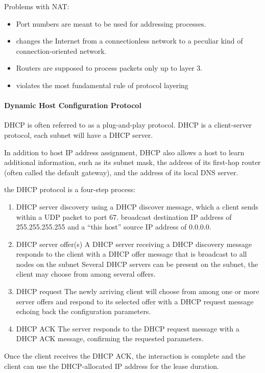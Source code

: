 Problems with NAT:
\begin{itemize}
    \item Port numbers are meant to be used for addressing processes. 
    \item changes the Internet from a connectionless network to a
    peculiar kind of connection-oriented network.
    \item Routers are supposed to process packets only up to layer 3.
    \item violates the most fundamental rule of protocol layering
\end{itemize}

\paragraph{Dynamic Host Configuration Protocol}DHCP is often referred to as a plug-and-play protocol. DHCP is a client-server protocol, each subnet will have a DHCP server. 

In addition to host IP address assignment, DHCP also allows a host
to learn additional information, such as its subnet mask, the
address of its first-hop router (often called the default gateway),
and the address of its local DNS server.

the DHCP protocol is a four-step process:
\begin{enumerate}\small
    \item DHCP server discovery
    \subitem using a DHCP discover message, which a client
    sends within a UDP packet to port 67.
    \subitem broadcast destination IP address of 255.255.255.255 and a “this
    host” source IP address of 0.0.0.0.
    \item DHCP server offer(s)
    \subitem A DHCP server receiving a DHCP discovery message responds to
    the client with a DHCP offer message that is broadcast to all
    nodes on the subnet
    \subitem Several DHCP servers can be present on the subnet, the client may
    choose from among several offers.
    \item DHCP request
    \subitem The newly arriving client will choose from among one or more
    server offers and respond to its selected offer with a DHCP
    request message echoing back the configuration parameters.
    \item DHCP ACK
    \subitem The server responds to the DHCP request message with a DHCP
    ACK message, confirming the requested parameters.
\end{enumerate}
Once the client receives the DHCP ACK, the interaction is
complete and the client can use the DHCP-allocated IP
address for the lease duration. 

